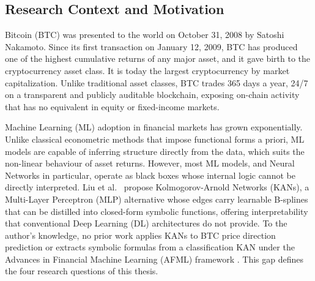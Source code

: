 \documentclass[12pt,a4paper,oneside]{article}
\begin{document}
%


\subsection{Research Context and Motivation}\label{subsec:context}


Bitcoin (BTC) was presented to the world on October 31, 2008 by Satoshi Nakamoto. Since its first transaction on January 12, 2009, BTC has produced one of the highest cumulative returns of any major asset, and it gave birth to the cryptocurrency asset class. It is today the largest cryptocurrency by market capitalization. Unlike traditional asset classes, BTC trades 365 days a year, 24/7 on a transparent and publicly auditable blockchain, exposing on-chain activity that has no equivalent in equity or fixed-income markets.


Machine Learning (ML) adoption in financial markets has grown exponentially. Unlike classical econometric methods that impose functional forms a priori, ML models are capable of inferring structure directly from the data, which suits the non-linear behaviour of asset returns. However, most ML models, and Neural Networks in particular, operate as black boxes whose internal logic cannot be directly interpreted. Liu et al.\ \citeyearpar{liu_kan_2024} propose Kolmogorov-Arnold Networks (KANs), a Multi-Layer Perceptron (MLP) alternative whose edges carry learnable B-splines that can be distilled into closed-form symbolic functions, offering interpretability that conventional Deep Learning (DL) architectures do not provide. To the author's knowledge, no prior work applies KANs to BTC price direction prediction or extracts symbolic formulas from a classification KAN under the Advances in Financial Machine Learning (AFML) framework \citep{lopez_de_prado_2018}. This gap defines the four research questions of this thesis.
\end{document}
